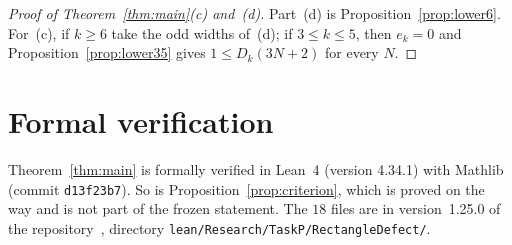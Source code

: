 \documentclass[11pt]{article}
\theoremstyle{definition}
\theoremstyle{remark}
\newcommand{\repoversion}{1.25.0}
\begin{document}
\begin{proof}[Proof of Theorem~\ref{thm:main}(c) and~(d)]
Part~(d) is Proposition~\ref{prop:lower6}. For~(c), if $k\ge6$ take the odd
widths of~(d); if $3\le k\le5$, then $e_k=0$ and Proposition~\ref{prop:lower35}
gives $1\le D_k(3N+2)$ for every $N$.
\end{proof}

{\sloppy
\section{Formal verification}\label{sec:lean}

Theorem~\ref{thm:main} is formally verified in Lean~4 (version 4.34.1) with
Mathlib~\cite{mathlib} (commit \texttt{d13f23b7}). So is
Proposition~\ref{prop:criterion}, which is proved on the way and is not part of
the frozen statement. The $18$ files are in version~\repoversion{} of the
repository~\cite{repo}, directory \texttt{lean/Research/TaskP/RectangleDefect/}.

}
\end{document}
